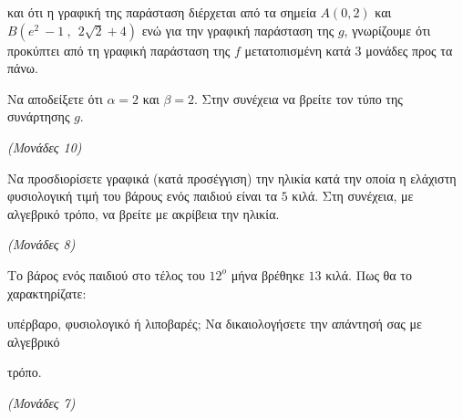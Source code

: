 \documentclass[11pt,a4paper,twoside]{book}
\newcommand{\monades}[1]{\hfill \textit{(Μονάδες #1)}}
\begin{document}
και ότι η γραφική της παράσταση διέρχεται από τα σημεία $A(0,2)$ και $B(e^{2}\  - 1\ ,\ \ 2\sqrt{2} + 4)$ ενώ για την γραφική παράσταση της $g$, γνωρίζουμε ότι προκύπτει από τη γραφική παράσταση της $f$ μετατοπισμένη κατά $3$ μονάδες προς τα πάνω.


\begin{center}


\end{center}


\begin{alist}
\item Να αποδείξετε ότι $\alpha = 2$ και $\beta = 2$. Στην συνέχεια να βρείτε τον τύπο της συνάρτησης $g$.

\monades{10}

\item Να προσδιορίσετε γραφικά (κατά προσέγγιση) την ηλικία κατά την οποία η ελάχιστη φυσιολογική τιμή του βάρους ενός παιδιού είναι τα $5$ κιλά. Στη συνέχεια, με αλγεβρικό τρόπο, να βρείτε με ακρίβεια την ηλικία.

\monades{8}

\item Το βάρος ενός παιδιού στο τέλος του $12^{o}$ μήνα βρέθηκε $13$ κιλά. Πως θα το χαρακτηρίζατε:

υπέρβαρο, φυσιολογικό ή λιποβαρές; Να δικαιολογήσετε την απάντησή σας με αλγεβρικό

τρόπο.

\monades{7}
\end{alist}
\end{document}
